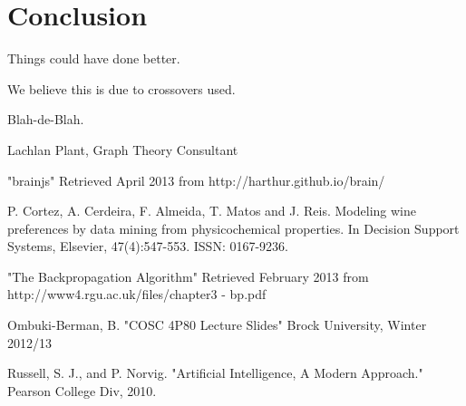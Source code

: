\documentclass[journal]{IEEEtran}
\begin{document}
\section{Conclusion}
Things could have done better.

We believe this is due to crossovers used.

Blah-de-Blah.





\begin{thebibliography}{1}

Lachlan Plant, Graph Theory Consultant

"brainjs" Retrieved April 2013 from
http://harthur.github.io/brain/

  P. Cortez, A. Cerdeira, F. Almeida, T. Matos and J. Reis. 
  Modeling wine preferences by data mining from physicochemical properties.
  In Decision Support Systems, Elsevier, 47(4):547-553. ISSN: 0167-9236.

"The Backpropagation Algorithm" Retrieved February 2013 from
http://www4.rgu.ac.uk/files/chapter3 - bp.pdf

Ombuki-Berman, B. "COSC 4P80 Lecture Slides" Brock University, Winter 2012/13

Russell, S. J., and P. Norvig. "Artificial Intelligence, A Modern Approach." Pearson College Div, 2010.

\end{thebibliography}


\end{document}
